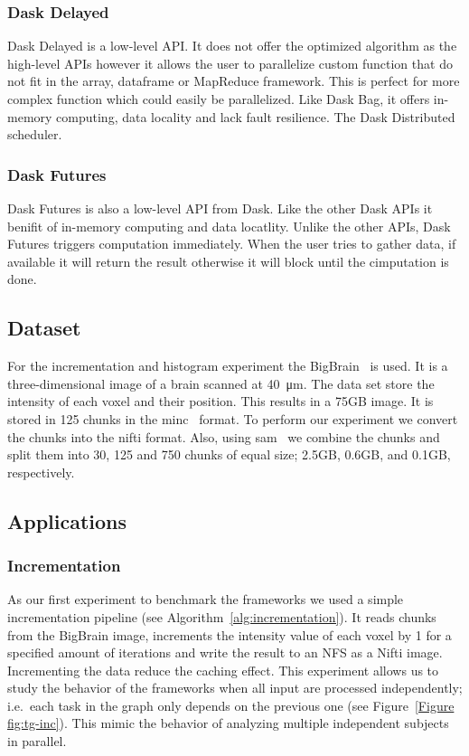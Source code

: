 \documentclass[conference]{IEEEtran}
\begin{document}
\subsubsection{Dask Delayed~\cite{dask-delayed}} Dask Delayed is a low-level API. It
does not offer the optimized algorithm as the high-level APIs however it allows the
user to parallelize custom function that do not fit in the array, dataframe or
MapReduce framework. This is perfect for more complex function which could easily be
parallelized. Like Dask Bag, it offers in-memory computing, data locality and lack
fault resilience. The Dask Distributed scheduler.

\subsubsection{Dask Futures~\cite{dask-futures}} Dask Futures is also a low-level API
from Dask. Like the other Dask APIs it benifit of in-memory computing and data
locatlity. Unlike the other APIs, Dask Futures triggers computation immediately. When
the user tries to gather data, if available it will return the result otherwise it
will block until the cimputation is done.


\subsection{Dataset}
For the incrementation and histogram experiment the BigBrain~\cite{Amunts:13} is
used. It is a three-dimensional image of a brain scanned at \SI{40}{\micro\metre}.
The data set store the intensity of each voxel and their position. This results in a
75GB image. It is stored in 125 chunks in the minc~\cite{minc} format. To perform our
experiment we convert the chunks into the nifti format. Also, using sam~\cite{sam} we
combine the chunks and split them into 30, 125 and 750 chunks of equal size; 2.5GB,
0.6GB, and 0.1GB, respectively.

\subsection{Applications}

\subsubsection{\textbf{Incrementation}}
As our first experiment to benchmark the frameworks we used a simple incrementation
pipeline (see Algorithm~\ref{alg:incrementation}). It reads chunks from the BigBrain
image, increments the intensity value of each voxel by 1 for a specified amount of
iterations and write the result to an NFS as a Nifti image. Incrementing the data
reduce the caching effect. This experiment allows us to study the behavior of the
frameworks when all input are processed independently; i.e.\ each task in the graph
only depends on the previous one (see Figure~\ref{Figure fig:tg-inc}). This mimic the
behavior of analyzing multiple independent subjects in parallel.
\end{document}
